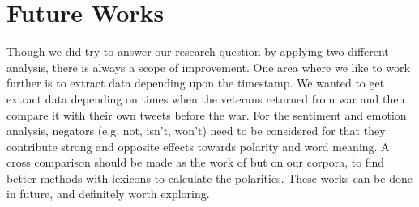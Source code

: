 \section{Future Works}

Though we did try to answer our research question by applying two different analysis, there is always a scope of improvement. One area where we like to work further is to extract data depending upon the timestamp. We wanted to get extract data depending on times when the veterans returned from war and then compare it with their own tweets before the war. For the sentiment and emotion analysis, negators (e.g. not, isn't, won't) need to be considered for that they contribute strong and opposite effects towards polarity and word meaning. A cross comparison should be made as the work of \cite{emoIntenT} but on our corpora, to find better methods with lexicons to calculate the polarities. These works can be done in future, and definitely worth exploring.
